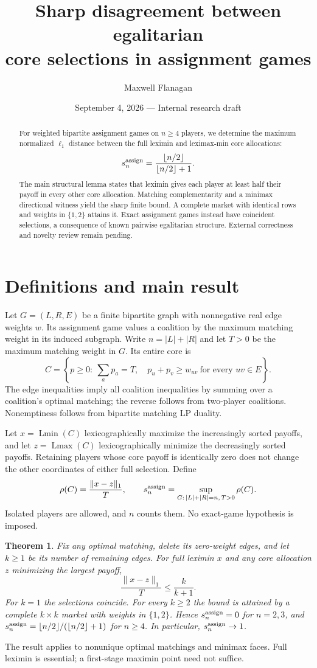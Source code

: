 \documentclass[11pt]{article}
\title{Sharp disagreement between egalitarian\\ core selections in assignment games}
\author{Maxwell Flanagan}
\date{September 4, 2026 --- Internal research draft}
\newtheorem{theorem}{Theorem}
\newcommand{\Lmin}{\operatorname{Lmin}}
\newcommand{\Lmax}{\operatorname{Lmax}}
\begin{document}
\maketitle
\begin{abstract}
For weighted bipartite assignment games on $n\ge4$ players, we determine
the maximum normalized $\ell_1$ distance between the full leximin and
leximax-min core allocations:
\[
 s_n^{\rm assign}=\frac{\lfloor n/2\rfloor}{\lfloor n/2\rfloor+1}.
\]
The main structural lemma states that leximin gives each player at least
half their payoff in every other core allocation. Matching complementarity
and a minimax directional witness yield the sharp finite bound. A complete
market with identical rows and weights in $\{1,2\}$ attains it. Exact
assignment games instead have coincident selections, a consequence of
known pairwise egalitarian structure. External correctness and novelty
review remain pending.
\end{abstract}

\section{Definitions and main result}
Let $G=(L,R,E)$ be a finite bipartite graph with nonnegative real edge
weights $w$. Its assignment game values a coalition by the maximum matching
weight in its induced subgraph. Write $n=|L|+|R|$ and let $T>0$ be the
maximum matching weight in $G$. Its entire core is
\begin{equation}\label{eq:core}
 C=\left\{p\ge0:\ \sum_a p_a=T,\quad p_u+p_v\ge w_{uv}
          \ \text{for every }uv\in E\right\}.
\end{equation}
The edge inequalities imply all coalition inequalities by summing over a
coalition's optimal matching; the reverse follows from two-player
coalitions. Nonemptiness follows from bipartite matching LP duality.

Let $x=\Lmin(C)$ lexicographically maximize the increasingly sorted
payoffs, and let $z=\Lmax(C)$ lexicographically minimize the decreasingly
sorted payoffs. Retaining players whose core payoff is identically zero
does not change the other coordinates of either full selection. Define
\[
 \rho(C)=\frac{\|x-z\|_1}{T},\qquad
 s_n^{\rm assign}=\sup_{G:\,|L|+|R|=n,\,T>0}\rho(C).
\]
Isolated players are allowed, and $n$ counts them. No exact-game hypothesis
is imposed.
\begin{theorem}\label{thm:sharp}
Fix any optimal matching, delete its zero-weight edges, and let $k\ge1$
be its number of remaining edges. For full leximin $x$ and \emph{any}
core allocation $z$ minimizing the largest payoff,
\[
 \frac{\|x-z\|_1}{T}\le\frac{k}{k+1}.
\]
For $k=1$ the selections coincide. For every $k\ge2$ the bound is attained
by a complete $k\times k$ market with weights in $\{1,2\}$. Hence
$s_n^{\rm assign}=0$ for $n=2,3$, and
$s_n^{\rm assign}=\lfloor n/2\rfloor/(\lfloor n/2\rfloor+1)$ for $n\ge4$.
In particular, $s_n^{\rm assign}\to1$.
\end{theorem}
The result applies to nonunique optimal matchings and minimax faces.
Full leximin is essential; a first-stage maximin point need not suffice.
\end{document}
